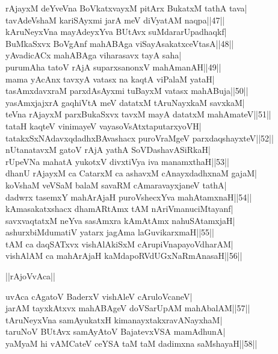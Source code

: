\documentclass{article}
\begin{document}
rAjayxM deYveVna BoVkatxvayxM pitArx BukatxM tathA tava|\\
tavAdeVshaM kariSAyxmi jarA meV diVyatAM naqpa||47||\\
kAruNeyxVna mayAdeyxYva BUtAvx suMdararUpadhaqkf|\\
BuMkaSxvx BoVgAnf mahABAga viSayAsakatxceVtasA||48||\\
yAvadicACx mahABAga viharasavx tayA saha|\\
purumAha tatoV rAjA suparxsanonxV mahAmanAH||49||\\
mama yAcAnx tavxyA vatasx na kaqtA viPalaM yataH|\\
tasAmxdavxraM parxdAsAyxmi tuBayxM vatasx mahABuja||50||\\
yasAmxjajxrA gaqhiVtA meV datatxM tAruNayxkaM savxkaM|\\
teVna rAjayxM parxBukaSxvx tavxM mayA datatxM mahAmateV||51||\\
tataH kaqteV vinimayeV vayasoVsAtxtaputarxyoVH|\\
tatakxSxNAdavxqdadhxBAvashacx puroVraMgeV parxdaqshayxteV||52||\\
nUtanatavxM gatoV rAjA yathA SoVDashavASiRkaH|\\
rUpeVNa mahatA yukotxV divxtiVya iva manamxthaH||53||\\
dhanU rAjayxM ca CatarxM ca ashavxM cAnayxdadhxnaM gajaM|\\
koVshaM veVSaM balaM savaRM cAmaravayxjaneV tathA|\\
dadwrx tasemxY mahArAjaH puroVshecxYva mahAtamxnaH||54||\\
kAmasakatxshacx dhamARtAmx tAM nAriVmanuciMtayanf|\\
savxvaqtatxM neYva sasAmxra kAmAtAmx nahuSAtamxjaH|\\
ashurxbiMdumatiV yatarx jagAma laGuvikarxmaH||55||\\
tAM ca daqSATxvx vishAlAkiSxM cArupiVnapayoVdharAM|\\
vishAlAM ca mahArAjaH kaMdapoRVdUGxNaRmAnasaH||56||\\

\begin{center}
||rAjoVvAca||
\end{center}

uvAca cAgatoV BaderxV vishAleV cAruloVcaneV|\\
jarAM tayxkAtxvx mahABAgeV doVSarUpAM mahAbalAM||57||\\
tAruNeyxVna samAyukatxH kimanayxtakxravANayxhaM|\\
taruNoV BUtAvx samAyAtoV BajatevxVSA mamAdhunA|\\
yaMyaM hi vAMCateV ceYSA taM taM dadimxna saMshayaH||58||\\
\end{document}
